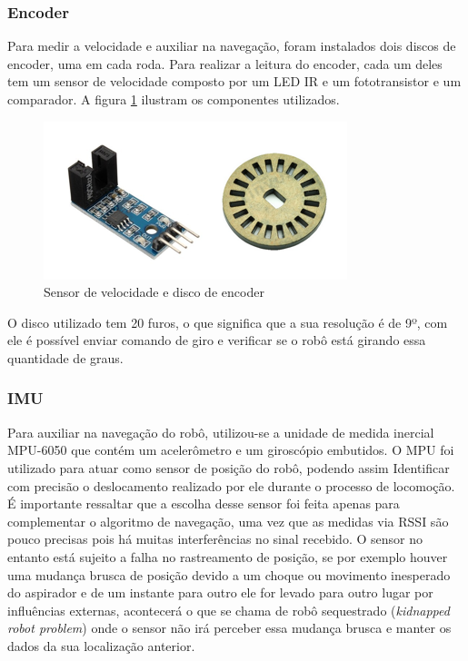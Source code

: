 		\subsubsection{Encoder}
		\label{sub:encoder}
		Para medir a velocidade e auxiliar na navegação, foram instalados dois discos de encoder, uma em cada roda. Para realizar a leitura do encoder, cada um deles tem um sensor de velocidade composto por um LED IR e um fototransistor e um comparador. A figura \ref{discoeencoder} ilustram os componentes utilizados.

		\begin{figure}[h]
			\centering
			\includegraphics[scale=0.6]{figuras/discoeencoder.png}
			\caption{Sensor de velocidade e disco de encoder}
			\label{discoeencoder}
		\end{figure}

		O disco utilizado tem 20 furos, o que significa que a sua resolução é de 9º, com ele é possível enviar comando de giro e verificar se o robô está girando essa quantidade de graus.

		\subsubsection{IMU}
		\label{sub:IMU}
			Para auxiliar na navegação do robô, utilizou-se a unidade de medida inercial MPU-6050 que contém um acelerômetro e um giroscópio embutidos. O MPU foi utilizado para atuar como sensor de posição do robô, podendo assim Identificar com precisão o deslocamento realizado por ele durante o processo de locomoção. É importante ressaltar que a escolha desse sensor foi feita apenas para complementar o algoritmo de navegação, uma vez que as medidas via RSSI são pouco precisas pois há muitas interferências no sinal recebido. O sensor no entanto está sujeito a falha no rastreamento de posição, se por exemplo houver uma mudança brusca de posição devido a um choque ou movimento inesperado do aspirador e de um instante para outro ele for levado para outro lugar por influências externas, acontecerá o que se chama de robô sequestrado (\textit{kidnapped robot problem}) onde o sensor não irá perceber essa mudança brusca e  manter os dados da sua localização anterior. 

